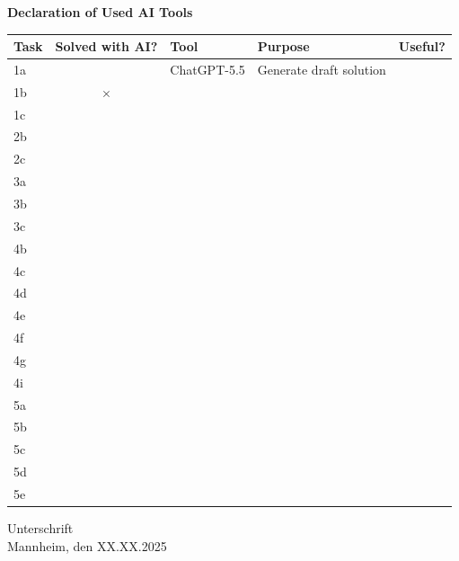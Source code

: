 \begin{center}
	\textbf{Declaration of Used AI Tools} \\[.3em]
	\begin{tabularx}{\textwidth}{lclXc}
		\toprule
		Task & Solved with AI? & Tool        & Purpose                 & Useful?    \\
		\midrule
		1a   & \checkmark      & ChatGPT-5.5 & Generate draft solution & \checkmark \\
		1b   & $\times$                                                             \\
		1c                                                                          \\
		\midrule
		2b                                                                          \\
		2c                                                                          \\
		\midrule
		3a                                                                          \\
		3b                                                                          \\
		3c                                                                          \\
		\midrule
		4b                                                                          \\
		4c                                                                          \\
		4d                                                                          \\
		4e                                                                          \\
		4f                                                                          \\
		4g                                                                          \\
		4i                                                                          \\
		\midrule
		5a                                                                          \\
		5b                                                                          \\
		5c                                                                          \\
		5d                                                                          \\
		5e                                                                          \\
		\bottomrule
	\end{tabularx}
\end{center}

\vspace{2cm}


\vspace{1cm}
\noindent Unterschrift\\
\noindent Mannheim, den XX.XX.2025 \hfill
